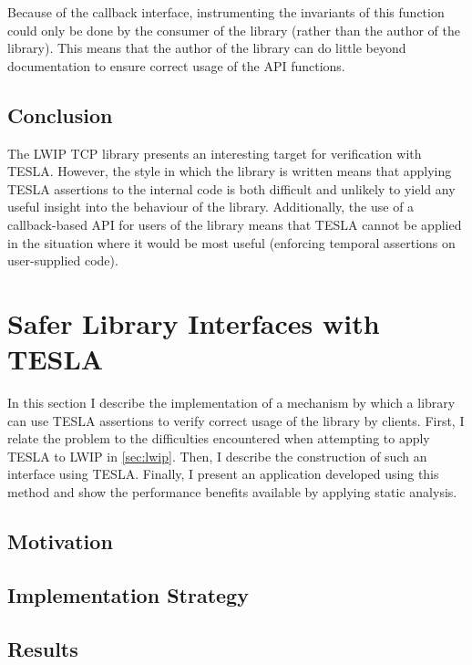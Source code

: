 Because of the callback interface, instrumenting the invariants of this
function could only be done by the consumer of the library (rather than
the author of the library). This means that the author of the library
can do little beyond documentation to ensure correct usage of the API
functions.

\subsection{Conclusion}

The LWIP TCP library presents an interesting target for verification
with TESLA. However, the style in which the library is written means
that applying TESLA assertions to the internal code is both difficult
and unlikely to yield any useful insight into the behaviour of the
library. Additionally, the use of a callback-based API for users of the
library means that TESLA cannot be applied in the situation where it
would be most useful (enforcing temporal assertions on user-supplied
code).

\section{Safer Library Interfaces with TESLA}

In this section I describe the implementation of a mechanism by which a
library can use TESLA assertions to verify correct usage of the library
by clients. First, I relate the problem to the difficulties encountered
when attempting to apply TESLA to LWIP in \autoref{sec:lwip}. Then, I
describe the construction of such an interface using TESLA. Finally, I
present an application developed using this method and show the
performance benefits available by applying static analysis.

\subsection{Motivation}

\subsection{Implementation Strategy}

\subsection{Results}
